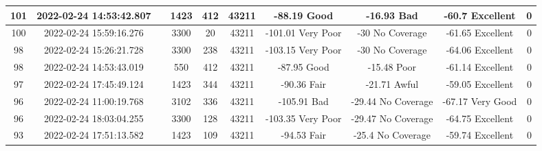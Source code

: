 \begin{longtable*}{|c|c|c|c|c|c|c|c|c|c|}
101&2022-02-24 14:53:42.807&&1423&412&43211& -88.19    Good        & -16.93    Bad         & -60.7     Excellent   & 0\\\hline
{}100&2022-02-24 15:59:16.276&&3300&20&43211& -101.01   Very Poor   & -30       No Coverage & -61.65    Excellent   & 0\\\hline
{}98&2022-02-24 15:26:21.728&&3300&238&43211& -103.15   Very Poor   & -30       No Coverage & -64.06    Excellent   & 0\\\hline
{}98&2022-02-24 14:53:43.019&&550&412&43211& -87.95    Good        & -15.48    Poor        & -61.14    Excellent   & 0\\\hline
{}97&2022-02-24 17:45:49.124&&1423&344&43211& -90.36    Fair        & -21.71    Awful       & -59.05    Excellent   & 0\\\hline
{}96&2022-02-24 11:00:19.768&&3102&336&43211& -105.91   Bad         & -29.44    No Coverage & -67.17    Very Good   & 0\\\hline
{}96&2022-02-24 18:03:04.255&&3300&128&43211& -103.35   Very Poor   & -29.47    No Coverage & -64.75    Excellent   & 0\\\hline
{}93&2022-02-24 17:51:13.582&&1423&109&43211& -94.53    Fair        & -25.4     No Coverage & -59.74    Excellent   & 0\\\hline

\end{longtable*}
